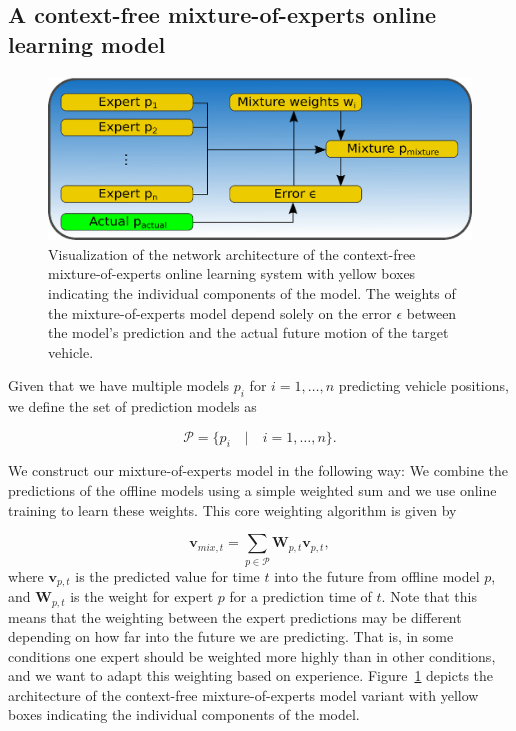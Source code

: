 \subsection{A context-free mixture-of-experts online learning model}%
\label{subsec:a_context_free_mixture_of_experts_online_learning_model}
\begin{figure}[t]
    \centering
    \includegraphics[width=0.8\linewidth]{imgs/mix_context_free_system_arch.eps}
    \caption{Visualization of the network architecture of the context-free mixture-of-experts online learning system with yellow boxes indicating the individual components of the model.
    The weights of the mixture-of-experts model depend solely on the error $\epsilon$ between the model's prediction and the actual future motion of the target vehicle.}
    \label{fig:mix_context_free_system_arch}
\end{figure}
Given that we have multiple models $ p_{i}$ for $i=1, \ldots, n$ predicting vehicle positions, we define the set of prediction models as 

\begin{equation}
\label{eq:mix_pred_model_set}
\mathcal{P} = \{ p_{i}  \quad | \quad i=1, \ldots, n \}.
\end{equation}

We construct our mixture-of-experts model in the following way:
We combine the predictions of the offline models using a simple weighted sum and we use online training to learn these weights.
This core weighting algorithm is given by 

\begin{equation}
\label{eq:mix_weighting}
\mathbf{v}_{mix,t} = \sum\limits_{ p \in \mathcal{P}} \mathbf{W}_{ p ,t} \mathbf{v}_{ p ,t},
\end{equation}
where $\mathbf{v}_{ p ,t}$ is the predicted value for time $t$ into the future from offline model $p$, and $\mathbf{W}_{ p ,t}$ is the weight for expert $p$ for a prediction time of $t$.
Note that this means that the weighting between the expert predictions may be different depending on how far into the future we are predicting.
That is, in some conditions one expert should be weighted more highly than in other conditions, and we want to adapt this weighting based on experience.
Figure~\ref{fig:mix_context_free_system_arch} depicts the architecture of the context-free mixture-of-experts model variant with yellow boxes indicating the individual components of the model.

